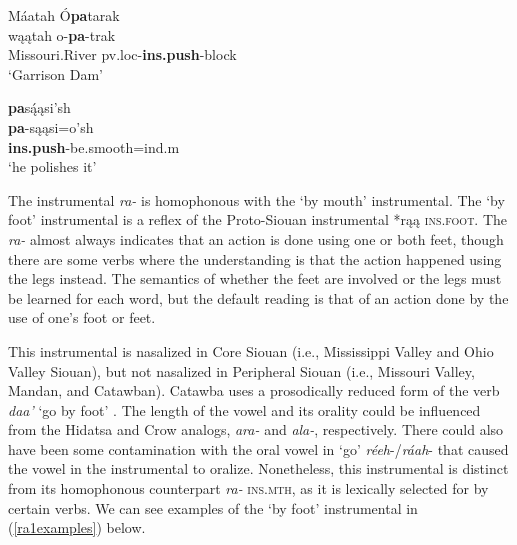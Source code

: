 \begin{exe}
\begin{xlist}
	\item \glll Máatah Ó\textbf{pa}tarak\\
	wąątah o-\textbf{pa}-trak\\
	\textnormal{Missouri.River} pv.loc-\textbf{ins.push}-\textnormal{block}\\
	\glt `Garrison Dam' \citep[256]{hollow1970}
	
	\item \glll \textbf{pa}są́ąsi'sh\\
	\textbf{pa}-sąąsi=o'sh\\
	\textbf{ins.push}-\textnormal{be.smooth}=ind.m\\
	\glt `he polishes it' \citep[461]{hollow1970}
		
	\end{xlist}

\end{exe}

\label{ParaByFoot}

The instrumental \textit{ra-} is homophonous with the `by mouth' instrumental. The `by foot' instrumental is a reflex of the Proto-Siouan instrumental *rąą \textsc{ins.foot}.  The \textit{ra-} almost always indicates that an action is done using one or both feet, though there are some verbs where the understanding is that the action happened using the legs instead. The semantics of whether the feet are involved or the legs must be learned for each word, but the default reading is that of an action done by the use of one's foot or feet.

This instrumental is nasalized in Core Siouan (i.e., Mississippi Valley and Ohio Valley Siouan), but not nasalized in Peripheral Siouan (i.e., Missouri Valley, Mandan, and Catawban). Catawba uses a prosodically reduced form of the verb \textit{daa'} `go by foot' \citep{rankin2015}. The length of the vowel and its orality could be influenced from the Hidatsa and Crow analogs, \textit{ara-} and \textit{ala-}, respectively. There could also have been some contamination with the oral vowel in `go' \textit{réeh}-/\textit{ráah}- that caused the vowel in the instrumental to oralize. Nonetheless, this instrumental is distinct from its homophonous counterpart \textit{ra-} \textsc{ins.mth}, as it is lexically selected for by certain verbs. We can see examples of the `by foot' instrumental in (\ref{ra1examples}) below.

